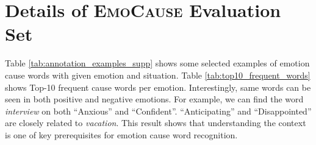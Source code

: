 \documentclass[11pt]{article}
\begin{document}
\section{Details of \textsc{EmoCause} Evaluation Set}
\label{sec:emotional_words_detail}

Table \ref{tab:annotation_examples_supp} shows some selected examples of emotion cause words with given emotion and situation.
Table \ref{tab:top10_frequent_words} shows Top-10 frequent cause words per emotion.
Interestingly, same words can be seen in both positive and negative emotions.
For example, we can find the word \textit{interview} on both ``Anxious'' and ``Confident''.
``Anticipating'' and ``Disappointed'' are closely related to \textit{vacation}.
This result shows that understanding the context is one of key prerequisites for emotion cause word recognition.
\end{document}

